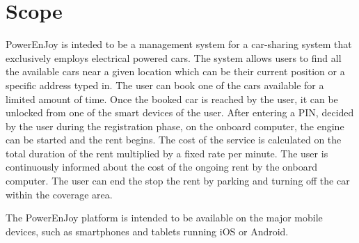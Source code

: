 \section{Scope}
PowerEnJoy is inteded to be a management system for a car-sharing system that exclusively employs electrical powered cars.
The system allows users to find all the available cars near a given location which can be their current position or a specific address typed in. The user can book one of the cars available for a limited amount of time.
Once the booked car is reached by the user, it can be unlocked from one of the smart devices of the user. After entering a PIN, decided by the user during the registration phase, on the onboard computer, the engine can be started and the rent begins.
The cost of the service is calculated on the total duration of the rent multiplied by a fixed rate per minute. The user is continuously informed about the cost of the ongoing rent by the onboard computer.
The user can end the stop the rent by parking and turning off the car within the coverage area.

The PowerEnJoy platform is intended to be available on the major mobile devices, such as smartphones and tablets running iOS or Android.
